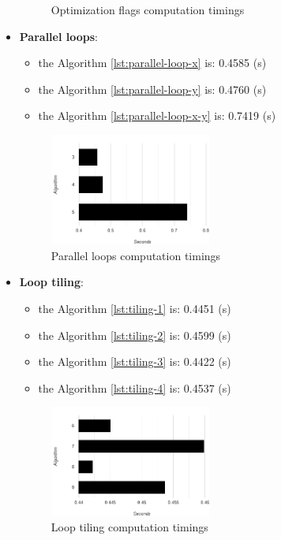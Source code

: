 \documentclass[conference]{IEEEtran}
\begin{document}
\begin{itemize}
\begin{figure}[htbp]
		\caption{Optimization flags computation timings}
		\label{fig:optimization-flags}
	\end{figure}	
	\item \textbf{Parallel loops}: 
	\begin{itemize}
		\item the Algorithm \ref{lst:parallel-loop-x} is: 0.4585 (s)
		\item the Algorithm \ref{lst:parallel-loop-y} is: 0.4760 (s)
		\item the Algorithm \ref{lst:parallel-loop-x-y} is: 0.7419 (s)
	\end{itemize}
	\begin{figure}[htbp]
		\centering
			\includegraphics[width=0.50\textwidth]{parallel-loops.png}
		\caption{Parallel loops computation timings}
		\label{fig:parallel-loops}
	\end{figure}		
	\item \textbf{Loop tiling}: 
	\begin{itemize}
		\item the Algorithm \ref{lst:tiling-1} is: 0.4451 (s)
		\item the Algorithm \ref{lst:tiling-2} is: 0.4599 (s)
		\item the Algorithm \ref{lst:tiling-3} is: 0.4422 (s)
		\item the Algorithm \ref{lst:tiling-4} is: 0.4537 (s)
	\end{itemize}	
	\begin{figure}[htbp]
		\centering
			\includegraphics[width=0.50\textwidth]{loop-tiling.png}
		\caption{Loop tiling computation timings}
		\label{fig:loop-tiling}

\end{figure}
\end{itemize}
\end{document}

